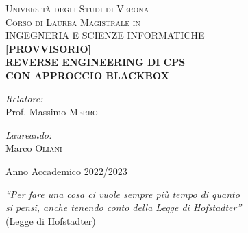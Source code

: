 \documentclass[a4paper,12pt,openright,twoside]{book}
\begin{document}
	
	\begin{titlepage}
		\begin{center}
			\thispagestyle{empty}
			
			
			
			\textsc{\LARGE Università degli Studi di Verona}\\[1.0cm]
			
			\textsc{\large Corso di Laurea Magistrale in \\ 
				INGEGNERIA E SCIENZE INFORMATICHE}\\[2.0cm]
			
			
			{ \Large \bfseries [PROVVISORIO] \\
				REVERSE ENGINEERING DI CPS \\ 
				CON APPROCCIO BLACKBOX \\[4.0cm] }
			
			\begin{minipage}{0.4\textwidth}
				\begin{flushleft} \large
					\emph{Relatore:}\\
					Prof. Massimo \textsc{Merro}
				\end{flushleft}
			\end{minipage}
			\begin{minipage}{0.4\textwidth}
				\begin{flushright} \large
					\emph{Laureando:} \\
					Marco \textsc{Oliani} 
				\end{flushright}
			\end{minipage}
			
			\vfill
			
			{\large Anno Accademico 2022/2023}
			
		\end{center}
	\end{titlepage}

\thispagestyle{empty}

\begin{titlepage}
	\thispagestyle{empty}
	\begin{flushright}
		\vspace*{40 mm}
		\small{\emph{``Per fare una cosa ci vuole sempre più tempo di quanto\\
				si pensi, anche tenendo conto della Legge di Hofstadter''}\\(Legge di Hofstadter)}
	\end{flushright}
	
	\vfill
\end{titlepage}
\thispagestyle{empty}
\end{document}
